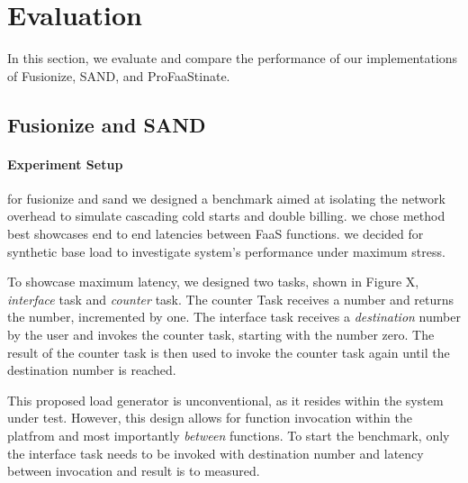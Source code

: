 \section{Evaluation}\label{sec:evaluation}

In this section, we evaluate and compare the performance of our implementations of Fusionize, SAND, and ProFaaStinate.

\subsection{Fusionize and SAND}

%
%

\paragraph{Experiment Setup}

for fusionize and sand we designed a benchmark aimed at isolating the network overhead to simulate cascading cold starts and double billing.
we chose method best showcases end to end latencies between FaaS functions. 
we decided for synthetic base load to investigate system's performance under maximum stress.
                                                                               
To showcase maximum latency, we designed two tasks, shown in Figure X, \emph{interface} task and \emph{counter} task. 
The counter Task receives a number and returns the number, incremented by one. 
The interface task receives a \emph{destination} number by the user and invokes the counter task, starting with the number zero. 
The result of the counter task is then used to invoke the counter task again until the destination number is reached.
                                                                               
This proposed load generator is unconventional, as it resides within the system under test. 
However, this design allows for function invocation within the platfrom and most importantly \emph{between} functions. 
To start the benchmark, only the interface task needs to be invoked with destination number and latency between invocation and result is to measured.

%
%

